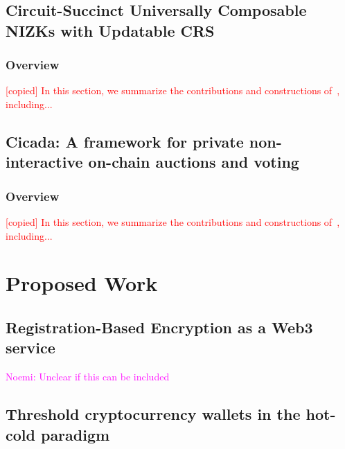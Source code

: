 \documentclass{article}
\newcommand{\copied}[1]{\textcolor{red}{[copied] #1}}
\newcommand{\noemi}[1]{\textcolor{magenta}{Noemi: #1}}
\begin{document}
\subsection{Circuit-Succinct Universally Composable NIZKs with Updatable CRS}
\subsubsection{Overview}
\copied{In this section, we summarize the contributions and constructions of~\cite{CSF:AGRS24}, including...}

\subsection{Cicada: A framework for private non-interactive on-chain auctions and voting}
\subsubsection{Overview}
\copied{In this section, we summarize the contributions and constructions of~\cite{EPRINT:GSZB23}, including...}

\section{Proposed Work}

\subsection{Registration-Based Encryption as a Web3 service}
\noemi{Unclear if this can be included}

\subsection{Threshold cryptocurrency wallets in the hot-cold paradigm}


{\small


}
\end{document}

